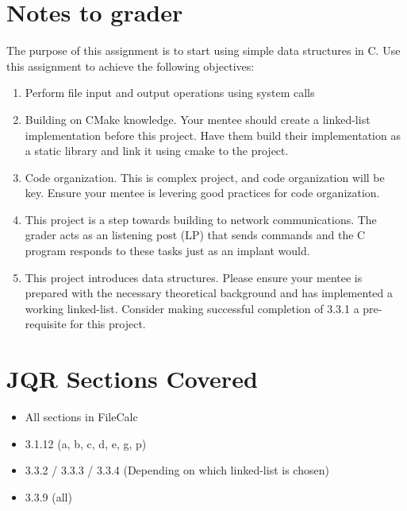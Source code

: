 \documentclass[letterpaper,12pt]{article}
\begin{document}
	\section{Notes to grader}
	The purpose of this assignment is to start using simple data structures in C. Use this assignment to achieve the following objectives:
	\begin{enumerate}
		\item Perform file input and output operations using system calls
		\item Building on CMake knowledge. Your mentee should create a linked-list implementation before this project. Have them build their implementation as a static library and link it using cmake to the project.
		\item Code organization. This is complex project, and code organization will be key. Ensure your mentee is levering good practices for code organization.
		\item This project is a step towards building to network communications. The grader acts as an listening post (LP) that sends commands and the C program responds to these tasks just as an implant would. 
		\item This project introduces data structures. Please ensure your mentee is prepared with the necessary theoretical background and has implemented a working linked-list. Consider making successful completion of 3.3.1 a pre-requisite for this project.
	\end{enumerate}

	\section{JQR Sections Covered}
	\begin{itemize}
		\item All sections in FileCalc
		\item 3.1.12 (a, b, c, d, e, g, p)
		\item 3.3.2 / 3.3.3 / 3.3.4 (Depending on which linked-list is chosen)
		\item 3.3.9 (all)
	\end{itemize}
	
	
\end{document}
